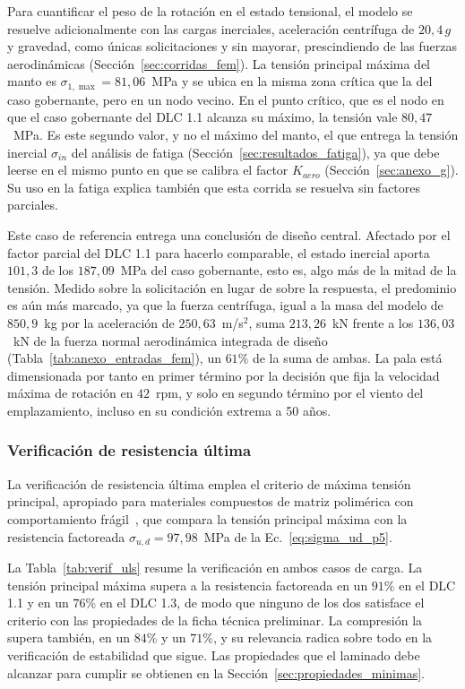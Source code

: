Para cuantificar el peso de la rotación en el estado tensional, el modelo se resuelve adicionalmente con las cargas inerciales, aceleración centrífuga de $20{,}4\,g$ y gravedad, como únicas solicitaciones y sin mayorar, prescindiendo de las fuerzas aerodinámicas (Sección~\ref{sec:corridas_fem}). La tensión principal máxima del manto es $\sigma_{1,\max} = 81{,}06$~MPa y se ubica en la misma zona crítica que la del caso gobernante, pero en un nodo vecino. En el punto crítico, que es el nodo en que el caso gobernante del DLC 1.1 alcanza su máximo, la tensión vale $80{,}47$~MPa. Es este segundo valor, y no el máximo del manto, el que entrega la tensión inercial $\sigma_{in}$ del análisis de fatiga (Sección~\ref{sec:resultados_fatiga}), ya que debe leerse en el mismo punto en que se calibra el factor $K_{aero}$ (Sección~\ref{sec:anexo_g}). Su uso en la fatiga explica también que esta corrida se resuelva sin factores parciales.

Este caso de referencia entrega una conclusión de diseño central. Afectado por el factor parcial del DLC 1.1 para hacerlo comparable, el estado inercial aporta $101{,}3$ de los $187{,}09$~MPa del caso gobernante, esto es, algo más de la mitad de la tensión. Medido sobre la solicitación en lugar de sobre la respuesta, el predominio es aún más marcado, ya que la fuerza centrífuga, igual a la masa del modelo de $850{,}9$~kg por la aceleración de $250{,}63$~m/s$^2$, suma $213{,}26$~kN frente a los $136{,}03$~kN de la fuerza normal aerodinámica integrada de diseño (Tabla~\ref{tab:anexo_entradas_fem}), un $61\%$ de la suma de ambas. La pala está dimensionada por tanto en primer término por la decisión que fija la velocidad máxima de rotación en $42$~rpm, y solo en segundo término por el viento del emplazamiento, incluso en su condición extrema a 50 años.

\subsubsection{Verificación de resistencia última}

La verificación de resistencia última emplea el criterio de máxima tensión principal, apropiado para materiales compuestos de matriz polimérica con comportamiento frágil~\parencite{Moraras2023}, que compara la tensión principal máxima con la resistencia factoreada $\sigma_{u,d} = 97{,}98$~MPa de la Ec.~\ref{eq:sigma_ud_p5}.

La Tabla~\ref{tab:verif_uls} resume la verificación en ambos casos de carga. La tensión principal máxima supera a la resistencia factoreada en un $91\%$ en el DLC 1.1 y en un $76\%$ en el DLC 1.3, de modo que ninguno de los dos satisface el criterio con las propiedades de la ficha técnica preliminar. La compresión la supera también, en un $84\%$ y un $71\%$, y su relevancia radica sobre todo en la verificación de estabilidad que sigue. Las propiedades que el laminado debe alcanzar para cumplir se obtienen en la Sección~\ref{sec:propiedades_minimas}.

